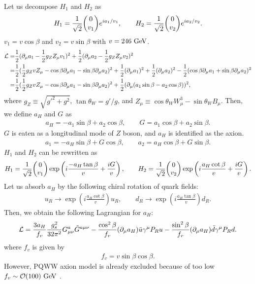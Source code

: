 \documentclass[11pt,a4paper]{article}
\begin{document}
Let us decompose $H_1$ and $H_2$ as
\begin{align}
    H_1 = \frac{1}{\sqrt{2}} \mqty(0 \\ v_1 ) e^{i a_1/v_1}, \qquad
    H_2 = \frac{1}{\sqrt{2}} \mqty(0 \\ v_2 ) e^{i a_2/v_2}.   
\end{align}
$v_1 = v \cos\beta$ and $v_2 = v \sin\beta$ with $v=246~{\rm GeV}$.
\begin{align}
    {\cal L} =& \frac{1}{2} (\partial_\mu a_1 - \frac{1}{2} g_Z Z_\mu v_1)^2 + \frac{1}{2} (\partial_\mu a_2 - \frac{1}{2} g_Z Z_\mu v_2)^2 \nonumber\\
    =& \frac{1}{2} ( \frac{1}{2}g_Z v Z_\mu - \cos\beta\partial_\mu a_1 - \sin\beta\partial_\mu a_2)^2 + \frac{1}{2} (\partial_\mu a_1)^2 + \frac{1}{2} (\partial_\mu a_2)^2 - \frac{1}{2} (\cos\beta\partial_\mu a_1 + \sin\beta\partial_\mu a_2)^2 \nonumber\\
    =& \frac{1}{2} ( \frac{1}{2} g_Z v Z_\mu - \cos\beta\partial_\mu a_1 - \sin\beta\partial_\mu a_2)^2 +  \frac{1}{2}( \partial_\mu(a_1 \sin\beta - a_2 \cos\beta ))^2,
\end{align}
where $g_Z \equiv \sqrt{g'^2 + g^2}$, $\tan\theta_W = g'/g$, and $Z_\mu \equiv \cos\theta_W W_\mu^3 - \sin\theta_W B_\mu$.
Then, we define $a_H$ and $G$ as
\begin{align}
    a_H = -a_1 \sin\beta + a_2 \cos\beta, \qquad
    G = a_1 \cos\beta + a_2 \sin\beta.
\end{align}
$G$ is eaten as a longitudinal mode of $Z$ boson, and $a_H$ is identified as the axion.
\begin{align}
    a_1 = -a_H \sin\beta + G \cos\beta, \qquad
    a_2 = a_H \cos\beta + G \sin\beta.
\end{align}
$H_1$ and $H_2$ can be rewritten as
\begin{align}
    H_1 = \frac{1}{\sqrt{2}} \mqty(0 \\ v_1 ) \exp\left( i \frac{-a_H \tan\beta}{v} + \frac{iG}{v} \right), \qquad
    H_2 = \frac{1}{\sqrt{2}} \mqty(0 \\ v_2 ) \exp\left( i \frac{a_H \cot\beta}{v} + \frac{iG}{v} \right).   
\end{align}
Let us absorb $a_H$ by the following chiral rotation of quark fields:
\begin{align}
    u_R \to \exp\left( i \frac{a_H \cot\beta}{v} \right) u_R, \qquad
    d_R \to \exp\left( i \frac{a_H \tan\beta}{v} \right) d_R.
\end{align}
Then, we obtain the following Lagrangian for $a_H$:
\begin{align}
    {\cal L} = \frac{3a_H}{f_v} \frac{g_s^2}{32\pi^2} G_{\mu\nu}^a \tilde G^{a\mu\nu} - \frac{\cos^2\beta}{f_v} (\partial_\mu a_H)\bar u \gamma^\mu P_R u - \frac{\sin^2\beta}{f_v} (\partial_\mu a_H)\bar d \gamma^\mu P_R d.
\end{align}
where $f_v$ is given by
\begin{align}
    f_v = v \sin\beta \cos\beta.
\end{align}
However, PQWW axion model is already excluded because of too low $f_v \sim {\cal O}(100)~{\rm GeV}$ \cite{Kim:1986ax, Cheng:1987gp}.
\end{document}
